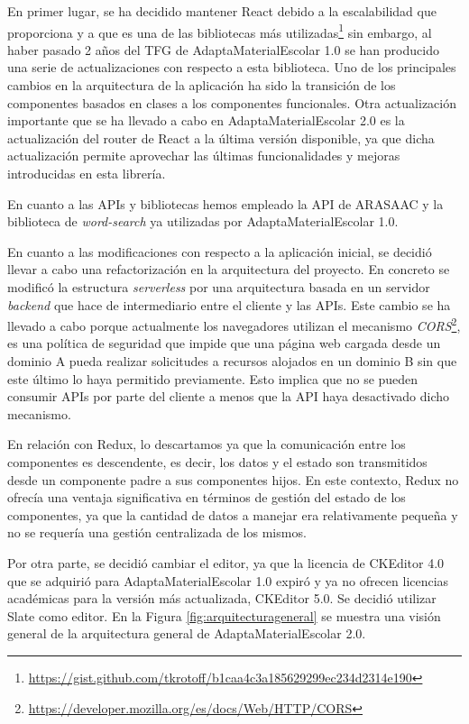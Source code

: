 En primer lugar, se ha decidido mantener React debido a la escalabilidad que proporciona y a que es una de las bibliotecas más utilizadas\footnote{\url{https://gist.github.com/tkrotoff/b1caa4c3a185629299ec234d2314e190}} sin embargo, al haber pasado 2 años del TFG de AdaptaMaterialEscolar 1.0 se han producido una serie de actualizaciones con respecto a esta biblioteca. Uno de los principales cambios en la arquitectura de la aplicación ha sido la transición de los componentes basados en clases a los componentes funcionales. Otra actualización importante que se ha llevado a cabo en AdaptaMaterialEscolar 2.0 es la actualización del router de React a la última versión disponible, ya que dicha actualización  permite aprovechar las últimas funcionalidades y mejoras introducidas en esta librería.

En cuanto a las APIs y bibliotecas hemos empleado la API de ARASAAC y la biblioteca de \textit{word-search} ya utilizadas por AdaptaMaterialEscolar 1.0.

En cuanto a las modificaciones con respecto a la aplicación inicial, se decidió llevar a cabo una refactorización en la arquitectura del proyecto. En concreto se modificó la estructura \textit{serverless} por una arquitectura basada en un servidor \textit{backend} que hace de intermediario entre el cliente y las APIs. Este cambio se ha llevado a cabo porque actualmente los navegadores utilizan el mecanismo \textit{CORS}\footnote{\url{https://developer.mozilla.org/es/docs/Web/HTTP/CORS}}, es una política de  seguridad que impide que una página web cargada desde un dominio A pueda realizar solicitudes a recursos alojados en un dominio B sin que este último lo haya permitido previamente. Esto implica que no se pueden consumir APIs por parte del cliente a menos que la API haya desactivado dicho mecanismo.

En relación con Redux, lo descartamos ya que la comunicación entre los componentes es descendente, es decir, los datos y el estado son transmitidos desde un componente padre a sus componentes hijos. En este contexto, Redux no ofrecía una ventaja significativa en términos de gestión del estado de los componentes, ya que la cantidad de datos a manejar era relativamente pequeña y no se requería una gestión centralizada de los mismos.

Por otra parte, se decidió cambiar el editor, ya que la licencia de CKEditor 4.0 que se adquirió para AdaptaMaterialEscolar 1.0 expiró y ya no ofrecen licencias académicas para la versión más actualizada, CKEditor 5.0. Se decidió utilizar Slate como editor. En la Figura \ref{fig:arquitecturageneral} se muestra una visión general de la arquitectura general de AdaptaMaterialEscolar 2.0.

